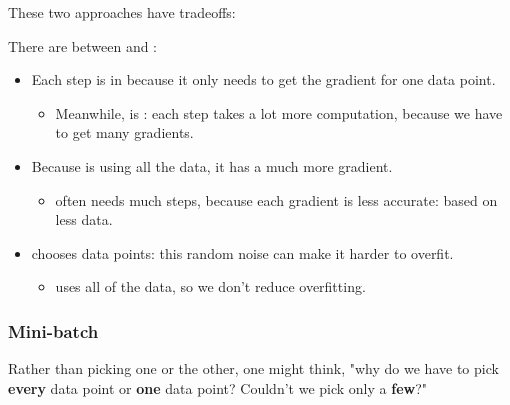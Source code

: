             These two approaches have tradeoffs:\\
            
            \begin{concept}
                There are  between  and :
                
                \begin{itemize}
                    \item Each step is  in  because it only needs to get the gradient for one data point.
                        \begin{itemize}
                            \item Meanwhile,  is : each step takes a lot more computation, because we have to get many gradients.
                        \end{itemize}
                        
                    \item Because  is using all the data, it has a much more  gradient.
                        \begin{itemize}
                            \item {} often needs much  steps, because each gradient is less accurate: based on less data.
                        \end{itemize}
                        
                    \item {}  chooses data points: this random noise can make it harder to overfit.
                        \begin{itemize}
                            \item {} uses all of the data, so we don't reduce overfitting.
                        \end{itemize}
                \end{itemize}
            \end{concept}
        
        \subsecdiv
        
        \subsubsection{Mini-batch}
        
            Rather than picking one or the other, one might think, "why do we have to pick \textbf{every} data point or \textbf{one} data point? Couldn't we pick only a \textbf{few}?"
            
